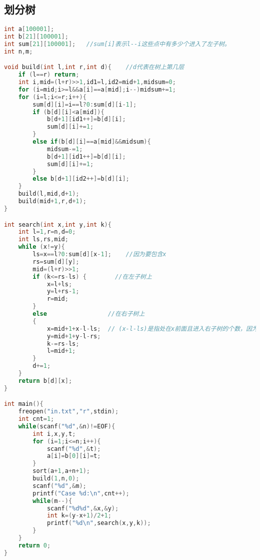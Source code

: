 \subsection{划分树}
		\begin{lstlisting}[language=c++]
int a[100001];
int b[21][100001];
int sum[21][100001];   //sum[i]表示l--i这些点中有多少个进入了左子树。
int n,m;

void build(int l,int r,int d){    //d代表在树上第几层
	if (l==r) return;
	int i,mid=(l+r)>>1,id1=l,id2=mid+1,midsum=0;
	for (i=mid;i>=l&&a[i]==a[mid];i--)midsum+=1;
	for (i=l;i<=r;i++){
		sum[d][i]=i==l?0:sum[d][i-1];
		if (b[d][i]<a[mid]){
			b[d+1][id1++]=b[d][i];
			sum[d][i]+=1;
		}
		else if(b[d][i]==a[mid]&&midsum){
			midsum-=1;
			b[d+1][id1++]=b[d][i];
			sum[d][i]+=1;
		}
		else b[d+1][id2++]=b[d][i];
	}
	build(l,mid,d+1);
	build(mid+1,r,d+1);
}

int search(int x,int y,int k){
	int l=1,r=n,d=0;
	int ls,rs,mid;
	while (x!=y){
		ls=x==l?0:sum[d][x-1];    //因为要包含x
		rs=sum[d][y];
		mid=(l+r)>>1;
		if (k<=rs-ls) {        //在左子树上
			x=l+ls;
			y=l+rs-1;
			r=mid;
		}
		else                 //在右子树上
		{
			x=mid+1+x-l-ls;  // (x-l-ls)是指处在x前面且进入右子树的个数，因为在子树中保持位置顺序不变，所以在右子树中x前面有(x-l-ls)个数。
			y=mid+1+y-l-rs;
			k-=rs-ls;
			l=mid+1;
		}
		d+=1;
	}
	return b[d][x];
}

int main(){
	freopen("in.txt","r",stdin); 
	int cnt=1;
	while(scanf("%d",&n)!=EOF){
		int i,x,y,t;
		for (i=1;i<=n;i++){
			scanf("%d",&t);
			a[i]=b[0][i]=t;
		}
		sort(a+1,a+n+1);
		build(1,n,0);
		scanf("%d",&m);
		printf("Case %d:\n",cnt++);
		while(m--){
			scanf("%d%d",&x,&y);
			int k=(y-x+1)/2+1;
			printf("%d\n",search(x,y,k));
		}
	}
	return 0;
}
	\end{lstlisting}